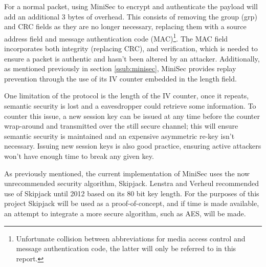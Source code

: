 \documentclass{mprop}
\begin{document}
For a normal packet, using MiniSec to encrypt and authenticate the payload will add an additional 3 bytes of overhead. This consists of removing the group (grp) and CRC fields as they are no longer necessary, replacing them with a source address field and message authentication code (MAC)\footnote{Unfortunate collision between abbreviations for media access control and message authentication code, the latter will only be referred to in this report.}. The MAC field incorporates both integrity (replacing CRC), and verification, which is needed to ensure a packet is authentic and hasn't been altered by an attacker. Additionally, as mentioned previously in section \ref{ssub:minisec}, MiniSec provides replay prevention through the use of its IV counter embedded in the length field.

One limitation of the protocol is the length of the IV counter, once it repeats, semantic security is lost and a eavesdropper could retrieve some information. To counter this issue, a new session key can be issued at any time before the counter wrap-around and transmitted over the still secure channel; this will ensure semantic security is maintained and an expensive asymmetric re-key isn't necessary. Issuing new session keys is also good practice, ensuring active attackers won't have enough time to break any given key.

As previously mentioned, the current implementation of MiniSec uses the now unrecommended security algorithm, Skipjack. Lenstra and Verheul recommended use of Skipjack until 2012 based on its 80 bit key length\cite{SkipjackRecommendation}. For the purposes of this project Skipjack will be used as a proof-of-concept, and if time is made available, an attempt to integrate a more secure algorithm, such as AES, will be made.

\end{document}
